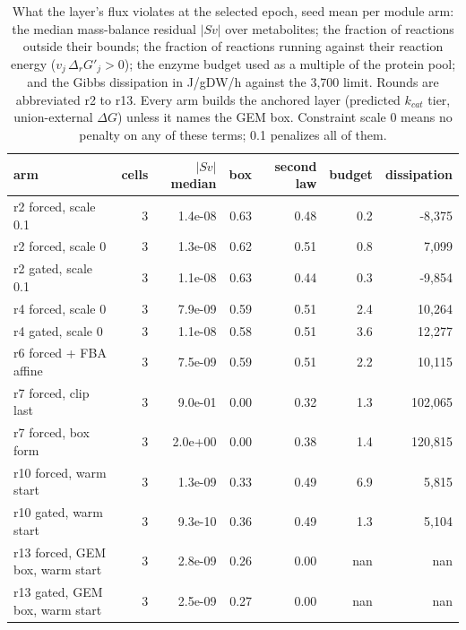 \begin{table}[H]
  \centering
  \scriptsize
  \caption[What the layer's flux violates]{What the layer's flux violates at the selected epoch, seed mean per module arm: the median mass-balance residual $|Sv|$ over metabolites; the fraction of reactions outside their bounds; the fraction of reactions running against their reaction energy ($v_j\,\Delta_r G'_j > 0$); the enzyme budget used as a multiple of the protein pool; and the Gibbs dissipation in J/gDW/h against the 3,700 limit. Rounds are abbreviated r2 to r13. Every arm builds the anchored layer (predicted $k_{cat}$ tier, union-external $\Delta G$) unless it names the GEM box. Constraint scale 0 means no penalty on any of these terms; 0.1 penalizes all of them.}
  \label{tab:violations}
  \begin{tabular}{@{}lrrrrrr@{}}
    \hline
    arm & cells & $|Sv|$ median & box & second law & budget & dissipation \\
    \hline
    r2 forced, scale 0.1 & 3 & 1.4e-08 & 0.63 & 0.48 & 0.2 & -8,375 \\
    r2 forced, scale 0 & 3 & 1.3e-08 & 0.62 & 0.51 & 0.8 & 7,099 \\
    r2 gated, scale 0.1 & 3 & 1.1e-08 & 0.63 & 0.44 & 0.3 & -9,854 \\
    r4 forced, scale 0 & 3 & 7.9e-09 & 0.59 & 0.51 & 2.4 & 10,264 \\
    r4 gated, scale 0 & 3 & 1.1e-08 & 0.58 & 0.51 & 3.6 & 12,277 \\
    r6 forced + FBA affine & 3 & 7.5e-09 & 0.59 & 0.51 & 2.2 & 10,115 \\
    r7 forced, clip last & 3 & 9.0e-01 & 0.00 & 0.32 & 1.3 & 102,065 \\
    r7 forced, box form & 3 & 2.0e+00 & 0.00 & 0.38 & 1.4 & 120,815 \\
    r10 forced, warm start & 3 & 1.3e-09 & 0.33 & 0.49 & 6.9 & 5,815 \\
    r10 gated, warm start & 3 & 9.3e-10 & 0.36 & 0.49 & 1.3 & 5,104 \\
    r13 forced, GEM box, warm start & 3 & 2.8e-09 & 0.26 & 0.00 & nan & nan \\
    r13 gated, GEM box, warm start & 3 & 2.5e-09 & 0.27 & 0.00 & nan & nan \\
    \hline
  \end{tabular}
\end{table}
